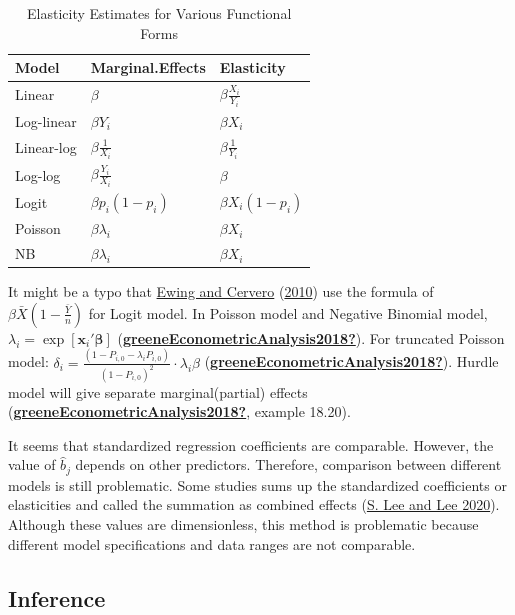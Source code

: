 \documentclass[
  11pt,
  openany]{memoir}
\begin{document}
\begin{table}

\caption{\label{tab:elas-formula}Elasticity Estimates for Various Functional Forms}
\centering
\fontsize{7}{9}\selectfont
\begin{tabular}[t]{lll}
\toprule
Model & Marginal.Effects & Elasticity\\
\midrule
Linear & $\beta$ & $\beta\frac{X_i}{Y_i}$\\
Log-linear & $\beta Y_i$ & $\beta X_i$\\
Linear-log & $\beta\frac{1}{X_i}$ & $\beta\frac{1}{Y_i}$\\
Log-log & $\beta\frac{Y_i}{X_i}$ & $\beta$\\
Logit & $\beta p_i(1-p_i)$ & $\beta X_i(1-p_i)$\\
\addlinespace
Poisson & $\beta\lambda_{i}$ & $\beta X_i$\\
NB & $\beta \lambda_{i}$ & $\beta X_i$\\
\bottomrule
\end{tabular}
\end{table}

It might be a typo that \protect\hyperlink{ref-ewingTravelBuiltEnvironment2010}{Ewing and Cervero} (\protect\hyperlink{ref-ewingTravelBuiltEnvironment2010}{2010}) use the formula of \(\beta \bar X\left(1-\frac{\bar Y}{n}\right)\) for Logit model.
In Poisson model and Negative Binomial model, \(\lambda_i=\exp[\mathbf{x}_i'\boldsymbol{\beta}]\) (\protect\hyperlink{ref-greeneEconometricAnalysis2018}{\textbf{greeneEconometricAnalysis2018?}}).
For truncated Poisson model: \(\delta_i=\frac{(1-P_{i,0}-\lambda_i P_{i,0})}{(1-P_{i,0})^2}\cdot\lambda_i\beta\) (\protect\hyperlink{ref-greeneEconometricAnalysis2018}{\textbf{greeneEconometricAnalysis2018?}}).
Hurdle model will give separate marginal(partial) effects (\protect\hyperlink{ref-greeneEconometricAnalysis2018}{\textbf{greeneEconometricAnalysis2018?}}, example 18.20).

It seems that standardized regression coefficients are comparable. However, the value of \(\hat b_j\) depends on other predictors. Therefore, comparison between different models is still problematic.
Some studies sums up the standardized coefficients or elasticities and called the summation as combined effects (\protect\hyperlink{ref-leeComparingImpactsLocal2020}{S. Lee and Lee 2020}). Although these values are dimensionless, this method is problematic because different model specifications and data ranges are not comparable.

\hypertarget{inference}{%
\subsection{Inference}\label{inference}}
\end{document}
